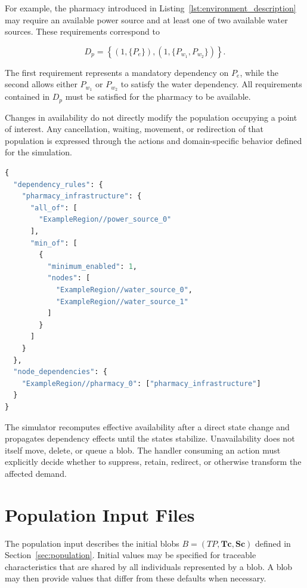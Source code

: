 For example, the pharmacy introduced in Listing~\ref{lst:environment_description} may require an available power source and at least one of two available water sources. These requirements correspond to

\[ D_p = \left\{ (1,\{P_e\}), (1,\{P_{w_1},P_{w_2}\}) \right\}. \] 

The first requirement represents a mandatory dependency on $P_e$, while the second allows either $P_{w_1}$ or $P_{w_2}$ to satisfy the water dependency. All requirements contained in $D_p$ must be satisfied for the pharmacy to be available. 

Changes in availability do not directly modify the population occupying a point of interest. Any cancellation, waiting, movement, or redirection of that population is expressed through the actions and domain-specific behavior defined for the simulation.

\begin{lstlisting}[language={Python},
caption={Example of all-of and minimum-of POI dependency rules.},
captionpos=b, label={lst:dependency_description}, basicstyle=\scriptsize]
{
  "dependency_rules": {
    "pharmacy_infrastructure": {
      "all_of": [
        "ExampleRegion//power_source_0"
      ],
      "min_of": [
        {
          "minimum_enabled": 1,
          "nodes": [
            "ExampleRegion//water_source_0",
            "ExampleRegion//water_source_1"
          ]
        }
      ]
    }
  },
  "node_dependencies": {
    "ExampleRegion//pharmacy_0": ["pharmacy_infrastructure"]
  }
}
\end{lstlisting}

The simulator recomputes effective availability after a direct state change
and propagates dependency effects until the states stabilize. Unavailability
does not itself move, delete, or queue a blob. The handler consuming an action
must explicitly decide whether to suppress, retain, redirect, or otherwise
transform the affected demand.


\section{Population Input Files}
\label{app:input_population}

The population input describes the initial blobs $B=(TP,\bm{Tc},\bm{Sc})$ defined in Section~\ref{sec:population}. Initial values may be specified for traceable characteristics that are shared by all individuals represented by a blob. A blob may then provide values that differ from these defaults when necessary. 

